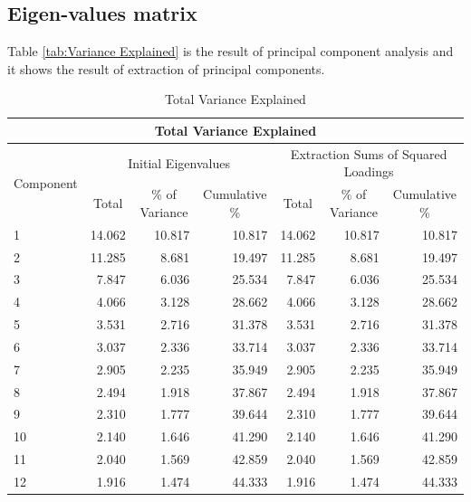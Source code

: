 \documentclass[review,3p,times,12pt,number]{elsarticle}
\begin{document}
\subsection{Eigen-values matrix}
Table \ref{tab:Variance Explained} is the result of principal component analysis and it shows the result of extraction of principal components.
\begin{table}[htbp]
  \scriptsize
  \centering
  \caption{Total Variance Explained}
    \begin{tabular}{rrrrrrr}
    \toprule
    \multicolumn{7}{c}{\textbf{Total Variance Explained}} \\
    \midrule
    \multicolumn{1}{l}{\multirow{2}[4]{*}{Component}} & \multicolumn{3}{c}{Initial Eigenvalues} & \multicolumn{3}{c}{Extraction Sums of Squared Loadings} \\
    \multicolumn{1}{l}{} & \multicolumn{1}{c}{Total} & \multicolumn{1}{c}{\% of Variance} & \multicolumn{1}{c}{Cumulative \%} & \multicolumn{1}{c}{Total} & \multicolumn{1}{c}{\% of Variance} & \multicolumn{1}{c}{Cumulative \%} \\
    \multicolumn{1}{l}{1} & 14.062 & 10.817 & 10.817 & 14.062 & 10.817 & 10.817 \\
    \multicolumn{1}{l}{2} & 11.285 & 8.681 & 19.497 & 11.285 & 8.681 & 19.497 \\
    \multicolumn{1}{l}{3} & 7.847 & 6.036 & 25.534 & 7.847 & 6.036 & 25.534 \\
    \multicolumn{1}{l}{4} & 4.066 & 3.128 & 28.662 & 4.066 & 3.128 & 28.662 \\
    \multicolumn{1}{l}{5} & 3.531 & 2.716 & 31.378 & 3.531 & 2.716 & 31.378 \\
    \multicolumn{1}{l}{6} & 3.037 & 2.336 & 33.714 & 3.037 & 2.336 & 33.714 \\
    \multicolumn{1}{l}{7} & 2.905 & 2.235 & 35.949 & 2.905 & 2.235 & 35.949 \\
    \multicolumn{1}{l}{8} & 2.494 & 1.918 & 37.867 & 2.494 & 1.918 & 37.867 \\
    \multicolumn{1}{l}{9} & 2.310 & 1.777 & 39.644 & 2.310 & 1.777 & 39.644 \\
    \multicolumn{1}{l}{10} & 2.140 & 1.646 & 41.290 & 2.140 & 1.646 & 41.290 \\
    \multicolumn{1}{l}{11} & 2.040 & 1.569 & 42.859 & 2.040 & 1.569 & 42.859 \\
    \multicolumn{1}{l}{12} & 1.916 & 1.474 & 44.333 & 1.916 & 1.474 & 44.333 \\

\end{tabular}
\end{table}
\end{document}
